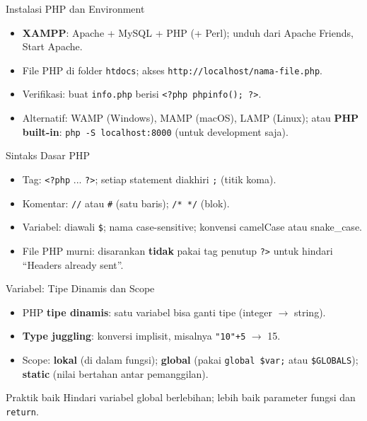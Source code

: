 \documentclass[handout]{beamer}
\begin{document}
\begin{frame}{Instalasi PHP dan Environment}
	\begin{itemize}
		\item \textbf{XAMPP}: Apache + MySQL + PHP (+ Perl); unduh dari Apache Friends, Start Apache.
		\item File PHP di folder \texttt{htdocs}; akses \texttt{http://localhost/nama-file.php}.
		\item Verifikasi: buat \texttt{info.php} berisi \texttt{<?php phpinfo(); ?>}.
		\item Alternatif: WAMP (Windows), MAMP (macOS), LAMP (Linux); atau \textbf{PHP built-in}: \texttt{php -S localhost:8000} (untuk development saja).
	\end{itemize}
\end{frame}

\begin{frame}{Sintaks Dasar PHP}
	\begin{itemize}
		\item Tag: \texttt{<?php} ... \texttt{?>}; setiap statement diakhiri \texttt{;} (titik koma).
		\item Komentar: \texttt{//} atau \texttt{\#} (satu baris); \texttt{/* */} (blok).
		\item Variabel: diawali \texttt{\$}; nama case-sensitive; konvensi camelCase atau snake\_case.
		\item File PHP murni: disarankan \textbf{tidak} pakai tag penutup \texttt{?>} untuk hindari ``Headers already sent''.
	\end{itemize}
\end{frame}

\begin{frame}{Variabel: Tipe Dinamis dan Scope}
	\begin{itemize}
		\item PHP \textbf{tipe dinamis}: satu variabel bisa ganti tipe (integer $\to$ string).
		\item \textbf{Type juggling}: konversi implisit, misalnya \texttt{"10"+5} $\to$ 15.
		\item Scope: \textbf{lokal} (di dalam fungsi); \textbf{global} (pakai \texttt{global \$var;} atau \texttt{\$GLOBALS}); \textbf{static} (nilai bertahan antar pemanggilan).
	\end{itemize}
	\begin{block}{Praktik baik}
		Hindari variabel global berlebihan; lebih baik parameter fungsi dan \texttt{return}.
	\end{block}
\end{frame}
\end{document}
